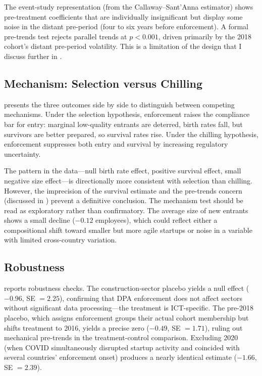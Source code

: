 \documentclass[12pt]{article}
\begin{document}
The event-study representation (from the Callaway--Sant'Anna estimator) shows pre-treatment coefficients that are individually insignificant but display some noise in the distant pre-period (four to six years before enforcement). A formal pre-trends test rejects parallel trends at $p < 0.001$, driven primarily by the 2018 cohort's distant pre-period volatility. This is a limitation of the design that I discuss further in .

\subsection{Mechanism: Selection versus Chilling}



 presents the three outcomes side by side to distinguish between competing mechanisms. Under the selection hypothesis, enforcement raises the compliance bar for entry: marginal low-quality entrants are deterred, birth rates fall, but survivors are better prepared, so survival rates rise. Under the chilling hypothesis, enforcement suppresses both entry and survival by increasing regulatory uncertainty.

The pattern in the data---null birth rate effect, positive survival effect, small negative size effect---is directionally more consistent with selection than chilling. However, the imprecision of the survival estimate and the pre-trends concern (discussed in ) prevent a definitive conclusion. The mechanism test should be read as exploratory rather than confirmatory. The average size of new entrants shows a small decline ($-0.12$ employees), which could reflect either a compositional shift toward smaller but more agile startups or noise in a variable with limited cross-country variation.

\subsection{Robustness}
\label{sec:threats}



 reports robustness checks. The construction-sector placebo yields a null effect ($-0.96$, SE $= 2.25$), confirming that DPA enforcement does not affect sectors without significant data processing---the treatment is ICT-specific. The pre-2018 placebo, which assigns enforcement groups their actual cohort membership but shifts treatment to 2016, yields a precise zero ($-0.49$, SE $= 1.71$), ruling out mechanical pre-trends in the treatment-control comparison. Excluding 2020 (when COVID simultaneously disrupted startup activity and coincided with several countries' enforcement onset) produces a nearly identical estimate ($-1.66$, SE $= 2.39$).
\end{document}
